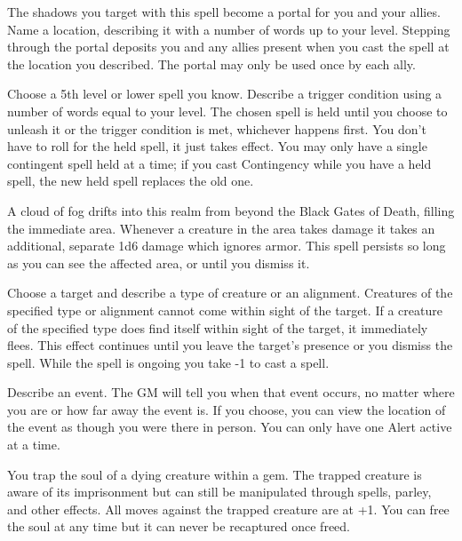  The shadows you target with this spell become a portal for you and your allies. Name a location, describing it with a number of words up to your level. Stepping through the portal deposits you and any allies present when you cast the spell at the location you described. The portal may only be used once by each ally.





 Choose a 5th level or lower spell you know. Describe a trigger condition using a number of words equal to your level. The chosen spell is held until you choose to unleash it or the trigger condition is met, whichever happens first. You don't have to roll for the held spell, it just takes effect. You may only have a single contingent spell held at a time; if you cast Contingency while you have a held spell, the new held spell replaces the old one.





 A cloud of fog drifts into this realm from beyond the Black Gates of Death, filling the immediate area. Whenever a creature in the area takes damage it takes an additional, separate 1d6 damage which ignores armor. This spell persists so long as you can see the affected area, or until you dismiss it.





 Choose a target and describe a type of creature or an alignment. Creatures of the specified type or alignment cannot come within sight of the target. If a creature of the specified type does find itself within sight of the target, it immediately flees. This effect continues until you leave the target's presence or you dismiss the spell. While the spell is ongoing you take -1 to cast a spell.





 Describe an event. The GM will tell you when that event occurs, no matter where you are or how far away the event is. If you choose, you can view the location of the event as though you were there in person. You can only have one Alert active at a time.




 You trap the soul of a dying creature within a gem. The trapped creature is aware of its imprisonment but can still be manipulated through spells, parley, and other effects. All moves against the trapped creature are at +1. You can free the soul at any time but it can never be recaptured once freed.


